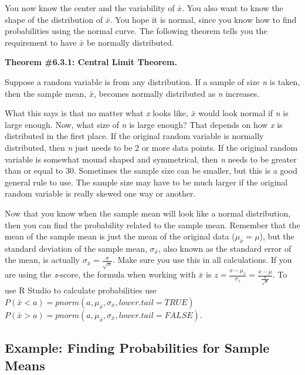 \documentclass[]{book}
\begin{document}
You now know the center and the variability of \(\bar{x}\). You also want to know the shape of the distribution of \(\bar{x}\). You hope it is normal, since you know how to find probabilities using the normal curve. The following theorem tells you the requirement to have \(\bar{x}\) be normally distributed.

\textbf{Theorem \#6.3.1: Central Limit Theorem.}

Suppose a random variable is from any distribution. If a sample of size \emph{n} is taken, then the sample mean, \(\bar{x}\), becomes normally distributed as \emph{n} increases.

What this says is that no matter what \emph{x} looks like, \(\bar{x}\) would look normal if \emph{n} is large enough. Now, what size of \emph{n} is large enough? That depends on how \emph{x} is distributed in the first place. If the original random variable is normally distributed, then \emph{n} just needs to be 2 or
more data points. If the original random variable is somewhat mound shaped and symmetrical, then \emph{n} needs to be greater than or equal to 30. Sometimes the sample size can be smaller, but this is a good general rule to use. The sample size may have to be much larger if the original random variable is really skewed one way or another.

Now that you know when the sample mean will look like a normal distribution, then you can find the probability related to the sample mean. Remember that the mean of the sample mean is just the mean of the original data (\(\mu_{\bar{x}}=\mu\)), but the standard deviation of the sample mean, \(\sigma_{\bar{x}}\), also known as the standard error of the mean, is actually \(\sigma_{\bar{x}}=\frac{\sigma}{\sqrt{n}}\). Make sure you use this in all calculations. If you are using the \emph{z}-score, the formula when working with \(\bar{x}\) is \(z=\frac{x-\mu_{\bar{x}}}{\sigma_{\bar{x}}}=\frac{x-\mu}{\frac{\sigma}{\sqrt{n}}}\).
To use R Studio to calculate probabilities use
\(P(\bar{x}<a)= pnorm(a, \mu_{\bar{x}}, \sigma_{\bar{x}}, lower.tail=TRUE)\)
\(P(\bar{x}>a)= pnorm(a, \mu_{\bar{x}}, \sigma_{\bar{x}}, lower.tail=FALSE)\).

\hypertarget{example-finding-probabilities-for-sample-means}{%
\subsection{Example: Finding Probabilities for Sample Means}\label{example-finding-probabilities-for-sample-means}}
\end{document}
